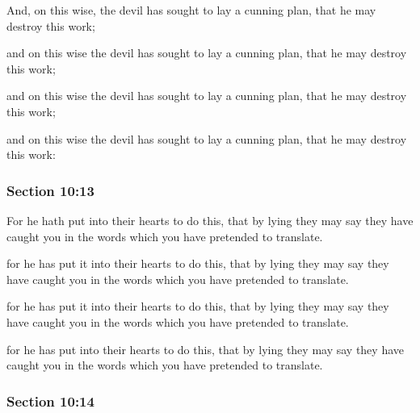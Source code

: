 		And, on this wise, the devil has sought to lay a cunning plan, that he may destroy this work;

		\begin{framed}
		\scriptsize
			\begin{compactdesc}
				\item[JSP] and on this wise the devil has sought to lay a cunning plan, that he may destroy this work;
				\item[RB1] [\textit{missing}] 
				\item[DC 1835] and on this wise the devil has sought to lay a cunning plan, that he may destroy this work;
				\item[DC 1844] and on this wise the devil has sought to lay a cunning plan, that he may destroy this work:
			\end{compactdesc}
		\end{framed}

	\subsubsection{Section 10:13} %
		\label{DC10-13}

		For he hath put into their hearts to do this, that by lying they may say they have caught you in the words which you have pretended to translate.

		\begin{framed}
		\scriptsize
			\begin{compactdesc}
				\item[JSP] for he has put it into their hearts to do this, that by lying they may say they have caught you in the words which you have pretended to translate.
				\item[RB1] [\textit{missing}] 
				\item[DC 1835] for he has put it into their hearts to do this, that by lying they may say they have caught you in the words which you have pretended to translate.
				\item[DC 1844] for he has put into their hearts to do this, that by lying they may say they have caught you in the words which you have pretended to translate.
			\end{compactdesc}
		\end{framed}

	\subsubsection{Section 10:14} %
		\label{DC10-14}

